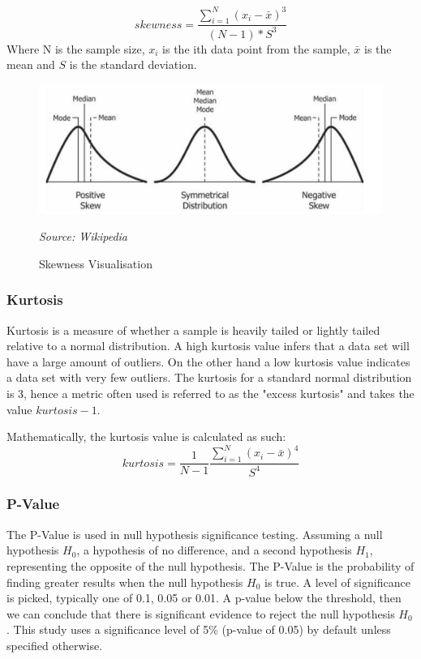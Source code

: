 \begin{equation}
    skewness = \frac{\sum_{i=1}^{N}(x_{i} - \bar{x})^{3}}{(N - 1) * S^{3}}
\end{equation}
Where N is the sample size, $x_{i}$ is the ith data point from the sample, $\bar{x}$ is the mean and $S$ is the standard deviation.

\begin{figure}[h!]
      \centering
      \includegraphics[scale=0.8]{lit_review/skewness.png}
      \caption{Skewness Visualisation}
      \label{skewness fig}
      \emph{Source: Wikipedia}
\end{figure}

\subsubsection{Kurtosis}

Kurtosis is a measure of whether a sample is heavily tailed or lightly tailed relative to a normal distribution. A high kurtosis value infers that a data set will have a large amount of outliers. On the other hand a low kurtosis value indicates a data set with very few outliers. The kurtosis for a standard normal distribution is 3, hence a metric often used is referred to as the "excess kurtosis" and takes the value $kurtosis - 1$.

Mathematically, the kurtosis value is calculated as such:
\begin{equation}
    kurtosis = \frac{1}{N - 1} \frac{\sum_{i=1}^{N}(x_{i} - \bar{x})^{4}}{S^{4}}
\end{equation}

\subsubsection{P-Value}

The P-Value is used in null hypothesis significance testing. Assuming a null hypothesis $H_{0}$, a hypothesis of no difference, and a second hypothesis $H_{1}$, representing the opposite of the null hypothesis. The P-Value is the probability of finding greater results when the null hypothesis $H_{0}$ is true. A level of significance is picked, typically one of 0.1, 0.05 or 0.01. A p-value below the threshold, then we can conclude that there is significant evidence to reject the null hypothesis $H_{0}$. This study uses a significance level of 5\% (p-value of 0.05) by default unless specified otherwise.


